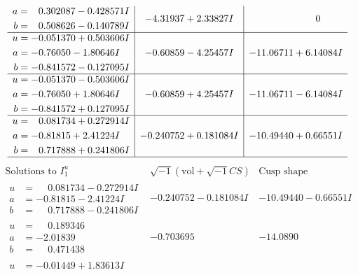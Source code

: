 \documentclass[1p]{elsarticle_modified}
\theoremstyle{definition}
\newcommand{\I}{\sqrt{-1}}
\begin{document}
$$\begin{array}{c|c|c}
\begin{aligned}
a &= \phantom{-}0.302087 - 0.428571 I \\
b &= \phantom{-}0.508626 - 0.140789 I\end{aligned}
 & -4.31937 + 2.33827 I & \phantom{-0.000000 } 0 \\ \hline\begin{aligned}
u &= -0.051370 + 0.503606 I \\
a &= -0.76050 - 1.80646 I \\
b &= -0.841572 - 0.127095 I\end{aligned}
 & -0.60859 - 4.25457 I & -11.06711 + 6.14084 I \\ \hline\begin{aligned}
u &= -0.051370 - 0.503606 I \\
a &= -0.76050 + 1.80646 I \\
b &= -0.841572 + 0.127095 I\end{aligned}
 & -0.60859 + 4.25457 I & -11.06711 - 6.14084 I \\ \hline\begin{aligned}
u &= \phantom{-}0.081734 + 0.272914 I \\
a &= -0.81815 + 2.41224 I \\
b &= \phantom{-}0.717888 + 0.241806 I\end{aligned}
 & -0.240752 + 0.181084 I & -10.49440 + 0.66551 I\\
 \hline 
 \end{array}$$\newpage$$\begin{array}{c|c|c}  
\text{Solutions to }I^u_{1}& \I (\text{vol} + \sqrt{-1}CS) & \text{Cusp shape}\\
 \hline 
\begin{aligned}
u &= \phantom{-}0.081734 - 0.272914 I \\
a &= -0.81815 - 2.41224 I \\
b &= \phantom{-}0.717888 - 0.241806 I\end{aligned}
 & -0.240752 - 0.181084 I & -10.49440 - 0.66551 I \\ \hline\begin{aligned}
u &= \phantom{-}0.189346\phantom{ +0.000000I} \\
a &= -2.01839\phantom{ +0.000000I} \\
b &= \phantom{-}0.471438\phantom{ +0.000000I}\end{aligned}
 & -0.703695\phantom{ +0.000000I} & -14.0890\phantom{ +0.000000I} \\ \hline\begin{aligned}
u &= -0.01449 + 1.83613 I \\

\end{aligned}
\end{array}$$
\end{document}

